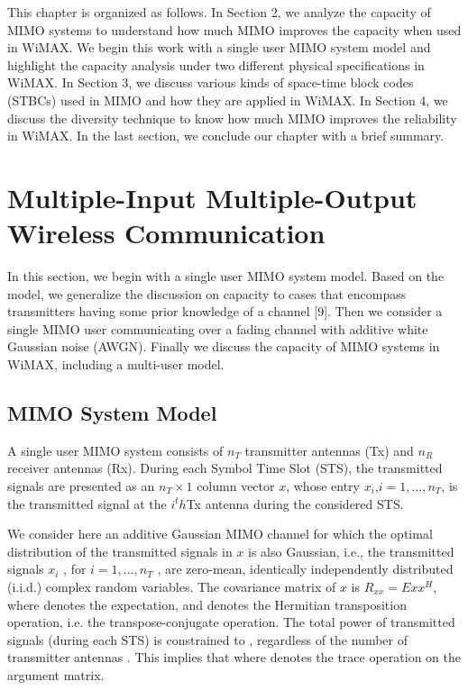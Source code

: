 This chapter is organized as follows. In Section 2, we analyze the
capacity of MIMO systems to understand how much MIMO improves the
capacity when used in WiMAX. We begin this work with a single user
MIMO system model and highlight the capacity analysis under two
different physical specifications in WiMAX. In Section 3, we discuss
various kinds of space-time block codes (STBCs) used in MIMO and how
they are applied in WiMAX. In Section 4, we discuss the diversity
technique to know how much MIMO improves the reliability in WiMAX.
In the last section, we conclude our chapter with a brief summary.

\section{Multiple-Input Multiple-Output Wireless Communication}

In this section, we begin with a single user MIMO system model.
Based on the model, we generalize the discussion on capacity to
cases that encompass transmitters having some prior knowledge of a
channel [9]. Then we consider a single MIMO user communicating over
a fading channel with additive white Gaussian noise (AWGN). Finally
we discuss the capacity of MIMO systems in WiMAX, including a
multi-user model.

\subsection{MIMO System Model}

A single user MIMO system consists of $n_{T}$ transmitter antennas
(Tx) and $n_{R}$ receiver antennas (Rx). During each Symbol Time
Slot (STS), the transmitted signals are presented as an
$n_{T}\times1$ column vector $x$, whose entry
$x_{i}$,$i=1,...,n_{T}$, is the transmitted signal at the $i^th$Tx
antenna during the considered STS.

We consider here an additive Gaussian MIMO channel for which the
optimal distribution of the transmitted signals in $x$ is also
Gaussian, i.e., the transmitted signals $x_{i}$ , for
$i=1,...,n_{T}$ , are zero-mean, identically independently
distributed (i.i.d.) complex random variables. The covariance matrix
of $x$ is $R_{xx}=E{xx^{H}}$, where denotes the expectation, and
denotes the Hermitian transposition operation, i.e. the
transpose-conjugate operation. The total power of transmitted
signals (during each STS) is constrained to , regardless of the
number of transmitter antennas . This implies that where  denotes
the trace operation on the argument matrix.


